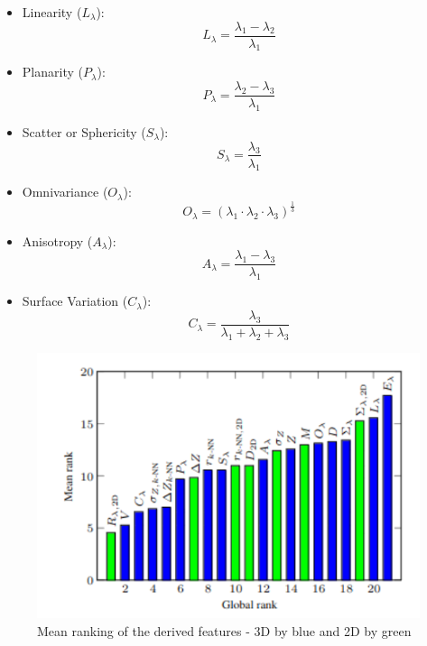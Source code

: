 \begin{itemize}
    \item Linearity (\( L_{\lambda} \)):
    \begin{equation}
        L_{\lambda} = \frac{\lambda_1 - \lambda_2}{\lambda_1}
    \end{equation}
    
    \item Planarity (\( P_{\lambda} \)):
    \begin{equation}
        P_{\lambda} = \frac{\lambda_2 - \lambda_3}{\lambda_1}
    \end{equation}
    
    \item Scatter or Sphericity (\( S_{\lambda} \)):
    \begin{equation}
        S_{\lambda} = \frac{\lambda_3}{\lambda_1}
    \end{equation}
    
    \item Omnivariance (\( O_{\lambda} \)):
    \begin{equation}
        O_{\lambda} = \left( \lambda_1 \cdot \lambda_2 \cdot \lambda_3 \right)^{\frac{1}{3}}
    \end{equation}
    
    \item Anisotropy (\( A_{\lambda} \)):
    \begin{equation}
        A_{\lambda} = \frac{\lambda_1 - \lambda_3}{\lambda_1}
    \end{equation}
    
    \item Surface Variation \parencite{rusu2009semantic} (\( C_{\lambda} \)):
    \begin{equation}\label{eq:surf_var}
        C_{\lambda} = \frac{\lambda_3}{\lambda_1 + \lambda_2 + \lambda_3}
    \end{equation}
    
\end{itemize}

\begin{figure}[htbp]
    \centering
    \includegraphics[width=0.6\linewidth]{97_graphics/related_work/geometric_features_ranking.pdf}
    \caption{Mean ranking of the derived features - 3D by blue and 2D by green \parencite{weinmann2013feature}}
    \label{fig:realted_work-3dgeo_feature_assessment}
\end{figure}

